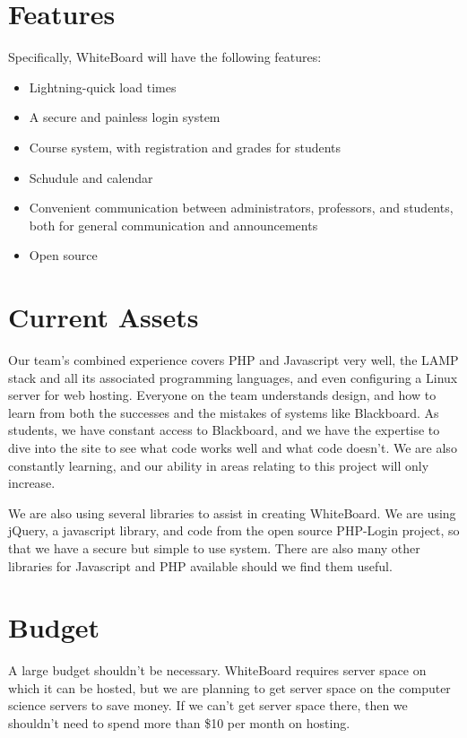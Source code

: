 \documentclass{article}
\begin{document}
\section{Features}

Specifically, WhiteBoard will have the following features:
\begin{itemize}
    \item Lightning-quick load times
    \item A secure and painless login system
    \item Course system, with registration and grades for students
    \item Schudule and calendar
    \item Convenient communication between administrators, professors, and
        students, both for general communication and announcements
    \item Open source
\end{itemize}

\section{Current Assets}

Our team's combined experience covers PHP and Javascript very well, the LAMP
stack and all its associated programming languages, and even configuring a
Linux server for web hosting. Everyone on the team understands design, and how
to learn from both the successes and the mistakes of systems like Blackboard.
As students, we have constant access to Blackboard, and we have the expertise
to dive into the site to see what code works well and what code doesn't. We are
also constantly learning, and our ability in areas relating to this project
will only increase.

We are also using several libraries to assist in creating WhiteBoard. We are
using jQuery, a javascript library, and code from the open source PHP-Login
project, so that we have a secure but simple to use system. There are also many
other libraries for Javascript and PHP available should we find them useful.

\section{Budget}

A large budget shouldn't be necessary. WhiteBoard requires server space on
which it can be hosted, but we are planning to get server space on the computer
science servers to save money. If we can't get server space there, then we
shouldn't need to spend more than \$10 per month on hosting.
\end{document}
